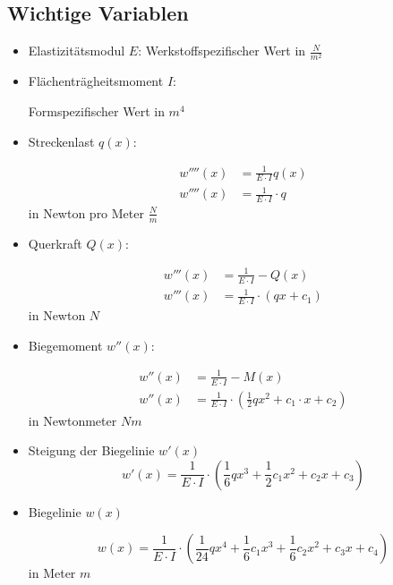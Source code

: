 \documentclass[a4paper,12pt]{article}
\begin{document}
\subsection{Wichtige Variablen}
\begin{itemize}
\item Elastizitätsmodul $E$:
	\subitem Werkstoffspezifischer Wert in $\frac{N}{m^2}$
\item Flächenträgheitsmoment $I$:
	\subitem \parbox[t]{\linewidth}{
	Formspezifischer Wert in $m^4$}
\item Streckenlast $q(x)$:
	\subitem \parbox[t]{\linewidth}{
	\begin{equation}
	\begin{split}
	w''''(x) & = \frac{1}{E \cdot I}q(x)\\
	w''''(x) & = \frac{1}{E \cdot I} \cdot q
	\end{split}
	\end{equation}
	in Newton pro Meter $\frac{N}{m}$}
\item Querkraft $Q(x)$:
	\subitem \parbox[t]{\linewidth}{
	\begin{equation}
	\begin{split}
	w'''(x) & = \frac{1}{E \cdot I}-Q(x)\\
	w'''(x) & = \frac{1}{E \cdot I}\cdot (qx + c_1)
	\end{split}
	\end{equation}
	in Newton $N$}
\item Biegemoment $w''(x)$:
	\subitem \parbox[t]{\linewidth}{
	\begin{equation}
	\begin{split}
	w''(x) & = \frac{1}{E \cdot I}-M(x)\\
	w''(x) & = \frac{1}{E \cdot I}\cdot (\frac{1}{2} qx^2 + c_1 \cdot x + c_2)
	\end{split}
	\end{equation}
	in Newtonmeter $Nm$}
\item Steigung der Biegelinie $w'(x)$
	\subitem $$w'(x) = \frac{1}{E \cdot I}\cdot (\frac{1}{6} qx^3 + \frac{1}{2} c_1x^2 + c_2x + c_3)$$
\item Biegelinie $w(x)$
	\subitem \parbox[t]{\linewidth}{ 
	$$w(x) = \frac{1}{E \cdot I}\cdot (\frac{1}{24} qx^4 + \frac{1}{6} c_1x^3 + \frac{1}{6} c_2x^2 + c_3x + c_4)$$
	in Meter $m$}
\end{itemize}
\end{document}
